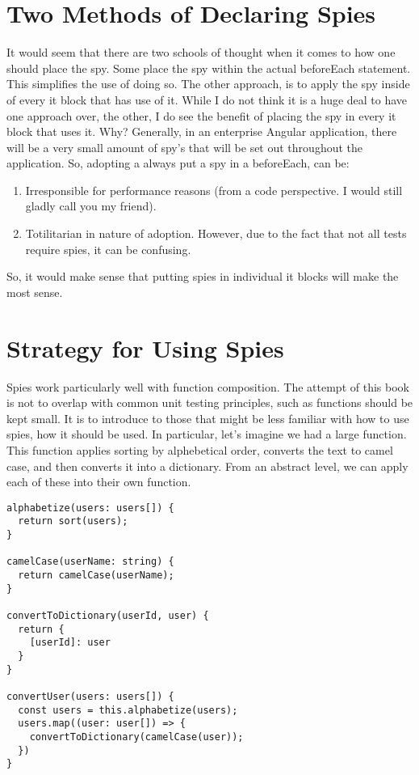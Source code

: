 \section{ Two Methods of Declaring Spies }
It would seem that there are two schools of thought when it comes to how one should
place the spy. Some place the spy within the actual beforeEach statement. This
simplifies the use of doing so. The other approach, is to apply the spy inside of
every it block that has use of it. While I do not think it is a huge deal to have
one approach over, the other, I do see the benefit of placing the spy in every
it block that uses it. Why? Generally, in an enterprise Angular application,
there will be a very small amount of spy's that will be set out throughout the
application. So, adopting a always put a spy in a beforeEach, can be:
\begin{enumerate}
  \item Irresponsible for performance reasons (from a code perspective. I would still gladly call you my friend).
  \item Totilitarian in nature of adoption. However, due to the fact that not
  all tests require spies, it can be confusing.
\end{enumerate}

So, it would make sense that putting spies in individual it blocks will make the
most sense.

\section{ Strategy for Using Spies }
Spies work particularly well with function composition. The attempt of this book
is not to overlap with common unit testing principles, such as functions should
be kept small. It is to introduce to those that might be less familiar with how
to use spies, how it should be used. In particular, let's imagine we had a large
function. This function applies sorting by alphebetical order, converts the text
to camel case, and then converts it into a dictionary. From an abstract level,
we can apply each of these into their own function.

\begin{lstlisting}
alphabetize(users: users[]) {
  return sort(users);
}

camelCase(userName: string) {
  return camelCase(userName);
}

convertToDictionary(userId, user) {
  return {
    [userId]: user
  }
}

convertUser(users: users[]) {
  const users = this.alphabetize(users);
  users.map((user: user[]) => {
    convertToDictionary(camelCase(user));
  })
}
\end{lstlisting}

